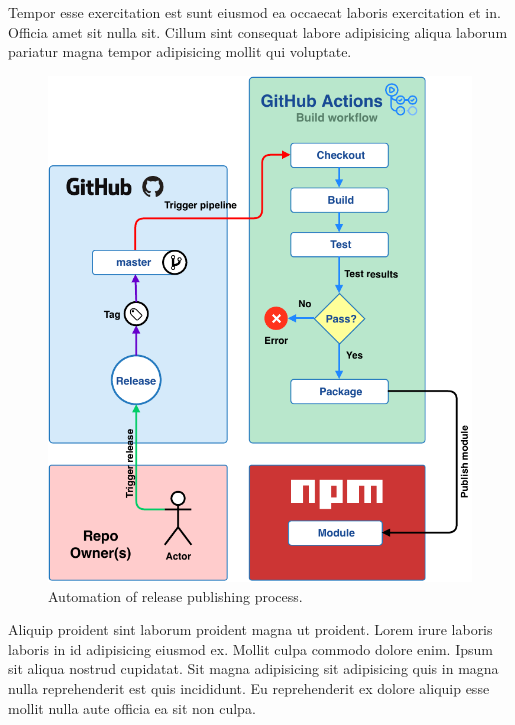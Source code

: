 Tempor esse exercitation est sunt eiusmod ea occaecat laboris exercitation et in. Officia amet sit nulla sit. Cillum sint consequat labore adipisicing aliqua laborum pariatur magna tempor adipisicing mollit qui voluptate.

\begin{figure}[h]
    \setlength{\abovecaptionskip}{25pt}
    \centering
    \includegraphics[page=1,scale=1]{sections/methodology/figures/release-automation.pdf}
    \caption{Automation of release publishing process.}
    \label{fig:release-automation}
\end{figure}

Aliquip proident sint laborum proident magna ut proident. Lorem irure laboris laboris in id adipisicing eiusmod ex. Mollit culpa commodo dolore enim. Ipsum sit aliqua nostrud cupidatat. Sit magna adipisicing sit adipisicing quis in magna nulla reprehenderit est quis incididunt. Eu reprehenderit ex dolore aliquip esse mollit nulla aute officia ea sit non culpa.
